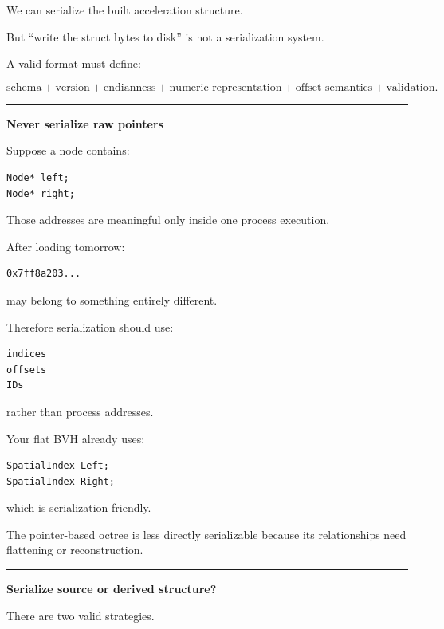 We can serialize the built acceleration structure.

But ``write the struct bytes to disk'' is not a serialization system.

A valid format must define:

\[
\boxed{
\text{schema}
+
\text{version}
+
\text{endianness}
+
\text{numeric representation}
+
\text{offset semantics}
+
\text{validation}.
}
\]

\begin{center}\rule{0.5\linewidth}{0.5pt}\end{center}

\textbf{Never serialize raw pointers}

Suppose a node contains:

\begin{verbatim}
Node* left;
Node* right;
\end{verbatim}

Those addresses are meaningful only inside one process execution.

After loading tomorrow:

\begin{verbatim}
0x7ff8a203...
\end{verbatim}

may belong to something entirely different.

Therefore serialization should use:

\begin{verbatim}
indices
offsets
IDs
\end{verbatim}

rather than process addresses.

Your flat BVH already uses:

\begin{verbatim}
SpatialIndex Left;
SpatialIndex Right;
\end{verbatim}

which is serialization-friendly.

The pointer-based octree is less directly serializable because its  relationships need flattening or reconstruction.

\begin{center}\rule{0.5\linewidth}{0.5pt}\end{center}

\textbf{Serialize source or derived structure?}

There are two valid strategies.

